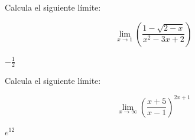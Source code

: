 \documentclass[addpoints,spanish, 12pt,a4paper]{exam}
\begin{document}
\begin{questions}

%
%
%

\question[1] Calcula el siguiente límite:

$$\lim_{x \to 1}\left(\frac{1 - \sqrt{2 - x}}{x^{2} - 3 x + 2}\right)$$

\begin{solution}$- \frac{1}{2}$\end{solution}




\question[1] Calcula el siguiente límite:

$$\lim_{x \to \infty} \left(\frac{x + 5}{x - 1}\right)^{2 x + 1}$$

\begin{solution}$e^{12}$\end{solution}







\end{questions}
\end{document}
